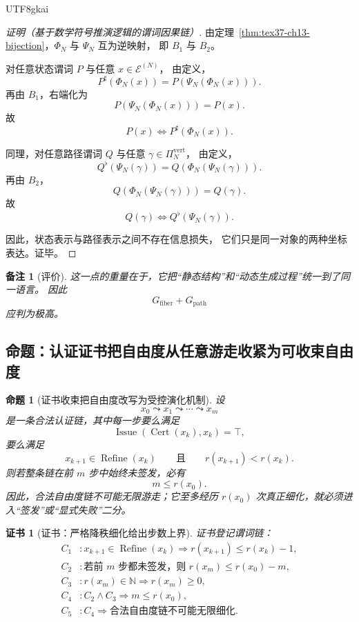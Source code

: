 \documentclass[12pt]{article}
\newtheorem{proposition}{命题}[section]
\newtheorem{remark}{备注}[section]
\newtheorem{Certificate}{证书}[section]
\newcommand{\NN}{\mathbb{N}}
\newcommand{\Cert}{\operatorname{Cert}}
\newcommand{\Refine}{\operatorname{Refine}}
\newcommand{\Issue}{\operatorname{Issue}}
\begin{document}
\begin{CJK*}{UTF8}{gkai}
\begin{proof}[证明（基于数学符号推演逻辑的谓词因果链）]
由定理~\ref{thm:tex37-ch13-bijection}，$\Phi_N$ 与 $\Psi_N$ 互为逆映射，
即 $B_1$ 与 $B_2$。

对任意状态谓词 $P$ 与任意 $x\in\mathcal E^{(N)}$，
由定义，
\[
  P^\sharp(\Phi_N(x))
  =
  P(\Psi_N(\Phi_N(x))).
\]
再由 $B_1$，右端化为
\[
  P(\Psi_N(\Phi_N(x)))=P(x).
\]
故
\[
  P(x)\Longleftrightarrow P^\sharp(\Phi_N(x)).
\]

同理，对任意路径谓词 $Q$ 与任意 $\gamma\in \Pi_N^{\mathrm{vert}}$，
由定义，
\[
  Q^\flat(\Psi_N(\gamma))
  =
  Q(\Phi_N(\Psi_N(\gamma))).
\]
再由 $B_2$，
\[
  Q(\Phi_N(\Psi_N(\gamma)))=Q(\gamma).
\]
故
\[
  Q(\gamma)\Longleftrightarrow Q^\flat(\Psi_N(\gamma)).
\]

因此，状态表示与路径表示之间不存在信息损失，
它们只是同一对象的两种坐标表达。证毕。
\end{proof}

\begin{remark}[评价]
这一点的重量在于，它把“静态结构”和“动态生成过程”统一到了同一语言。
因此
\[
  G_{\mathrm{fiber}}+G_{\mathrm{path}}
\]
应判为极高。
\end{remark}

\subsection{命题：认证证书把自由度从任意游走收紧为可收束自由度}
\label{subsec:tex37-ch14-cert}

\begin{proposition}[证书收束把自由度改写为受控演化机制]
\label{prop:tex37-ch14-cert}
设
\[
  x_0\leadsto x_1\leadsto \cdots \leadsto x_m
\]
是一条合法认证链，其中每一步要么满足
\[
  \Issue(\Cert(x_k),x_k)=\top,
\]
要么满足
\[
  x_{k+1}\in \Refine(x_k)
  \qquad\text{且}\qquad
  r(x_{k+1})<r(x_k).
\]
则若整条链在前 $m$ 步中始终未签发，必有
\[
  m\le r(x_0).
\]
因此，合法自由度链不可能无限游走；它至多经历 $r(x_0)$ 次真正细化，就必须进入“签发”或“显式失败”二分。
\end{proposition}

\begin{Certificate}[证书：严格降秩细化给出步数上界]
\label{cert:tex37-ch14-cert}
证书登记谓词链：
\[
\begin{aligned}
  C_1 &: x_{k+1}\in \Refine(x_k)\Rightarrow r(x_{k+1})\le r(x_k)-1,\\
  C_2 &: \text{若前 }m\text{ 步都未签发，则 } r(x_m)\le r(x_0)-m,\\
  C_3 &: r(x_m)\in\NN\Rightarrow r(x_m)\ge 0,\\
  C_4 &: C_2\wedge C_3\Rightarrow m\le r(x_0),\\
  C_5 &: C_4\Rightarrow \text{合法自由度链不可能无限细化}.
\end{aligned}
\]
\end{Certificate}


\end{CJK*}
\end{document}

